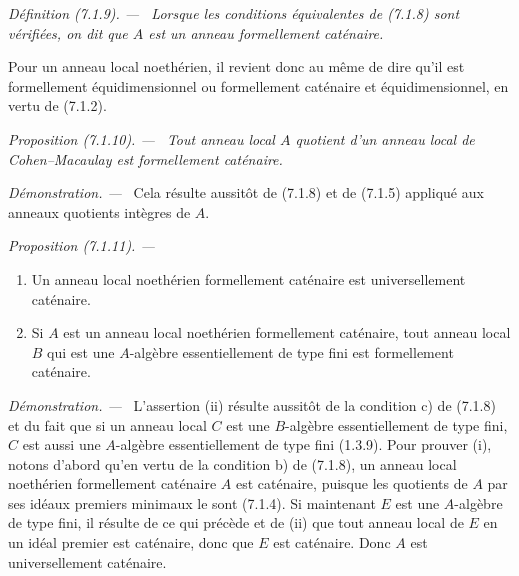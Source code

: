 \documentclass[10pt,oneside]{book}
\newcommand{\oldpage}[2][]{%
  \setcounter{footnote}{0}%
  \marginpar{\scriptsize\textbf{#1}~|~#2}\ignorespaces}
\newenvironment{definition}[1][]{%
  \par\medskip\noindent\itshape Définition (#1). ---\ }{\par}
\newenvironment{proposition}[1][]{%
  \par\medskip\noindent\itshape Proposition (#1). ---\ }{\par}
\newenvironment{proof}{%
  \par\medskip\noindent\textit{Démonstration. ---\ }}{\par}
\begin{document}
\begin{definition}[7.1.9]
\label{IV.2.s7.1.9-fr}
Lorsque les conditions équivalentes de (7.1.8) sont vérifiées, on dit que
$A$ est un anneau \emph{formellement caténaire}.
\end{definition}

Pour un anneau local noethérien, il revient donc au même de dire qu'il est
formellement équidimensionnel ou formellement caténaire et
équidimensionnel, en vertu de (7.1.2).

\begin{proposition}[7.1.10]
\label{IV.2.s7.1.10-fr}
Tout anneau local $A$ quotient d'un anneau local de Cohen--Macaulay est
formellement caténaire.
\end{proposition}

\begin{proof}
Cela résulte aussitôt de (7.1.8) et de (7.1.5) appliqué aux anneaux
quotients intègres de $A$.
\end{proof}

\begin{proposition}[7.1.11]
\label{IV.2.s7.1.11-fr}
\begin{enumerate}
\item[(i)] Un anneau local noethérien formellement caténaire est universellement
caténaire.
\item[(ii)] Si $A$ est un anneau local noethérien formellement caténaire, tout
anneau local $B$ qui est une $A$-algèbre essentiellement de type fini est
formellement caténaire.
\end{enumerate}
\end{proposition}

\begin{proof}
L'assertion (ii) résulte aussitôt de la condition c) de (7.1.8) et du fait
que si un anneau local $C$ est une $B$-algèbre essentiellement de type
fini, $C$ est aussi une $A$-algèbre essentiellement de type fini (1.3.9).
Pour prouver (i), notons d'abord qu'en vertu de la condition b) de (7.1.8),
un anneau local noethérien formellement caténaire $A$ est caténaire,
puisque les quotients de $A$ par ses idéaux premiers minimaux le sont
(7.1.4). Si maintenant $E$ est une $A$-algèbre de type fini, il résulte de
ce qui précède et de (ii) que tout anneau local de $E$ en un idéal premier
est caténaire, donc que $E$ est caténaire. Donc $A$ est universellement
caténaire.
\end{proof}

\oldpage[IV-2]{187}
\end{document}

